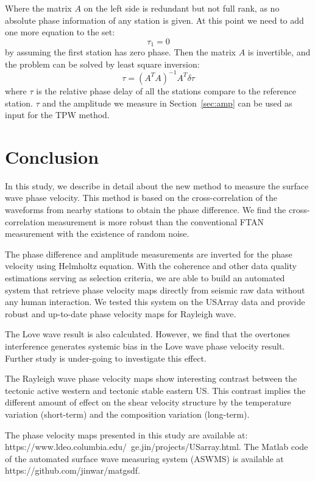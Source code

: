 \documentclass[referee]{gji}
\begin{document}
Where the matrix $A$ on the left side is redundant but not full rank, as no absolute phase information of any station is given. At this point we need to add one more equation to the set:
\[
\tau_1 = 0
\]
by assuming the first station has zero phase. Then the matrix $A$ is invertible, and the problem can be solved by least square inversion:
\[
\tau = (A^TA)^{-1}A^T \delta\tau
\]
where $\tau$ is the relative phase delay of all the stations compare to the reference station. $\tau$ and the amplitude we measure in Section~\ref{sec:amp} can be used as input for the TPW method.

\section{Conclusion}

In this study, we describe in detail about the new method to measure the surface wave phase velocity. This method is based on the cross-correlation of the waveforms from nearby stations to obtain the phase difference. We find the cross-correlation measurement is more robust than the conventional FTAN measurement with the existence of random noise.

The phase difference and amplitude measurements are inverted for the phase velocity using Helmholtz equation. With the coherence and other data quality estimations serving as selection criteria, we are able to build an automated system that retrieve phase velocity maps directly from seismic raw data without any human interaction. We tested this system on the USArray data and provide robust and up-to-date phase velocity maps for Rayleigh wave.

The Love wave result is also calculated. However, we find that the overtones interference generates systemic bias in the Love wave phase velocity result. Further study is under-going to investigate this effect.

The Rayleigh wave phase velocity maps show interesting contrast between the tectonic active western and tectonic stable eastern US. This contrast implies the different amount of effect on the shear velocity structure by the temperature variation (short-term) and the composition variation (long-term).

The phase velocity maps presented in this study are available at: https://www.ldeo.columbia.edu/~ge.jin/projects/USarray.html. The Matlab code of the automated surface wave measuring system (ASWMS) is available at https://github.com/jinwar/matgsdf.
\end{document}
